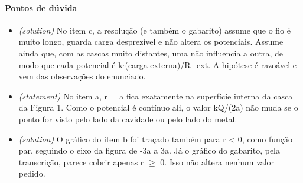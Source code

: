 \documentclass{article}%
\begin{document}
\paragraph{Pontos de dúvida}%
\begin{itemize}%
\item%
\textit{(solution)} No item c, a resolução (e também o gabarito) assume que o fio é muito longo, guarda carga desprezível e não altera os potenciais. Assume ainda que, com as cascas muito distantes, uma não influencia a outra, de modo que cada potencial é k$\cdot$(carga externa)/R\_ext. A hipótese é razoável e vem das observações do enunciado.%
\item%
\textit{(statement)} No item a, r = a fica exatamente na superfície interna da casca da Figura 1. Como o potencial é contínuo ali, o valor kQ/(2a) não muda se o ponto for visto pelo lado da cavidade ou pelo lado do metal.%
\item%
\textit{(solution)} O gráfico do item b foi traçado também para r < 0, como função par, seguindo o eixo da figura de -3a a 3a. Já o gráfico do gabarito, pela transcrição, parece cobrir apenas r $\geq$ 0. Isso não altera nenhum valor pedido.%
\end{itemize}%
\end{document}
